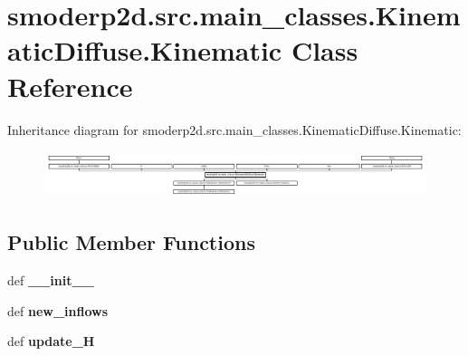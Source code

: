 \hypertarget{classsmoderp2d_1_1src_1_1main__classes_1_1KinematicDiffuse_1_1Kinematic}{\section{smoderp2d.\-src.\-main\-\_\-classes.\-Kinematic\-Diffuse.\-Kinematic Class Reference}
\label{classsmoderp2d_1_1src_1_1main__classes_1_1KinematicDiffuse_1_1Kinematic}
}
Inheritance diagram for smoderp2d.\-src.\-main\-\_\-classes.\-Kinematic\-Diffuse.\-Kinematic\-:\begin{figure}[H]
\begin{center}
\leavevmode
\includegraphics[height=1.376598cm]{d8/dbb/classsmoderp2d_1_1src_1_1main__classes_1_1KinematicDiffuse_1_1Kinematic}
\end{center}
\end{figure}
\subsection*{Public Member Functions}
\begin{DoxyCompactItemize}
\item 
\hypertarget{classsmoderp2d_1_1src_1_1main__classes_1_1KinematicDiffuse_1_1Kinematic_adc69a0521f7fd79c536c029d5a1d92aa}{def {\bfseries \-\_\-\-\_\-init\-\_\-\-\_\-}}\label{classsmoderp2d_1_1src_1_1main__classes_1_1KinematicDiffuse_1_1Kinematic_adc69a0521f7fd79c536c029d5a1d92aa}

\item 
\hypertarget{classsmoderp2d_1_1src_1_1main__classes_1_1KinematicDiffuse_1_1Kinematic_a1f9263e8cccf589dc954a3223730befe}{def {\bfseries new\-\_\-inflows}}\label{classsmoderp2d_1_1src_1_1main__classes_1_1KinematicDiffuse_1_1Kinematic_a1f9263e8cccf589dc954a3223730befe}

\item 
\hypertarget{classsmoderp2d_1_1src_1_1main__classes_1_1KinematicDiffuse_1_1Kinematic_aa64ce31fcbf34b0cfce9905dc7c8d8fb}{def {\bfseries update\-\_\-\-H}}\label{classsmoderp2d_1_1src_1_1main__classes_1_1KinematicDiffuse_1_1Kinematic_aa64ce31fcbf34b0cfce9905dc7c8d8fb}

\end{DoxyCompactItemize}
